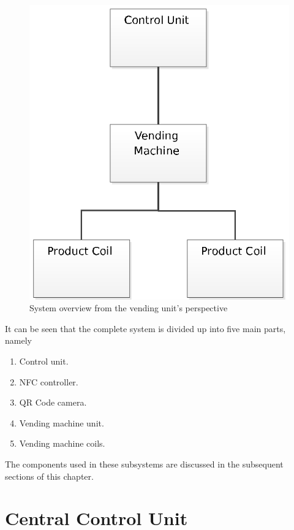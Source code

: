 \begin{figure}[h]
\centering
\includegraphics[trim=5cm 0 0 6cm, clip=true,
scale=0.7]{vending_machine_system_overview.eps}
\caption{System overview from the vending unit's perspective}
\label{fig:system-overview-machine}
\end{figure}

It can be seen that the complete system is divided up into five main parts, namely 

\begin{enumerate}
  \item Control unit.
  \item NFC controller.
  \item QR Code camera.
  \item Vending machine unit.
  \item Vending machine coils.
\end{enumerate}

The components used in these subsystems are discussed in the subsequent sections of this
chapter.

\section{Central Control Unit}

